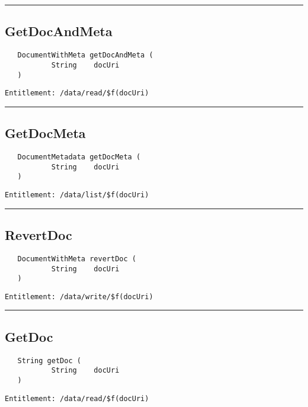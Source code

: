 \rule{12cm}{2pt}
\subsection{GetDocAndMeta}
\label{Api:GetDocAndMeta}
\begin{verbatim}
   DocumentWithMeta getDocAndMeta (
           String    docUri
   )
\end{verbatim}
\begin{Verbatim}[fontsize=\small, formatcom=\color{Maroon}]
  Entitlement: /data/read/$f(docUri)
\end{Verbatim}



\rule{12cm}{2pt}
\subsection{GetDocMeta}
\label{Api:GetDocMeta}
\begin{verbatim}
   DocumentMetadata getDocMeta (
           String    docUri
   )
\end{verbatim}
\begin{Verbatim}[fontsize=\small, formatcom=\color{Maroon}]
  Entitlement: /data/list/$f(docUri)
\end{Verbatim}



\rule{12cm}{2pt}
\subsection{RevertDoc}
\label{Api:RevertDoc}
\begin{verbatim}
   DocumentWithMeta revertDoc (
           String    docUri
   )
\end{verbatim}
\begin{Verbatim}[fontsize=\small, formatcom=\color{Maroon}]
  Entitlement: /data/write/$f(docUri)
\end{Verbatim}



\rule{12cm}{2pt}
\subsection{GetDoc}
\label{Api:GetDoc}
\begin{verbatim}
   String getDoc (
           String    docUri
   )
\end{verbatim}
\begin{Verbatim}[fontsize=\small, formatcom=\color{Maroon}]
  Entitlement: /data/read/$f(docUri)
\end{Verbatim}



